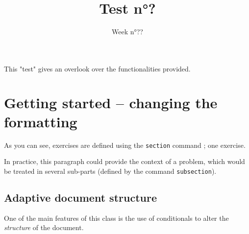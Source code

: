 \documentclass[12pt,code]{HSP-Test}
\title{Test n°?}
\date{Week n°??}
\begin{document}
	
	This "test" gives an overlook over the functionalities provided.
	
	\section{Getting started -- changing the formatting}
	
	As you can see, exercises are defined using the \texttt{section} command ; one exercise.
	
	In practice, this paragraph could provide the context of a problem, which would be treated in several sub-parts (defined by the command \texttt{subsection}).
	
	\subsection{Adaptive document structure}
	One of the main features of this class is the use of conditionals to alter the \emph{structure} of the document.
	
\end{document}
